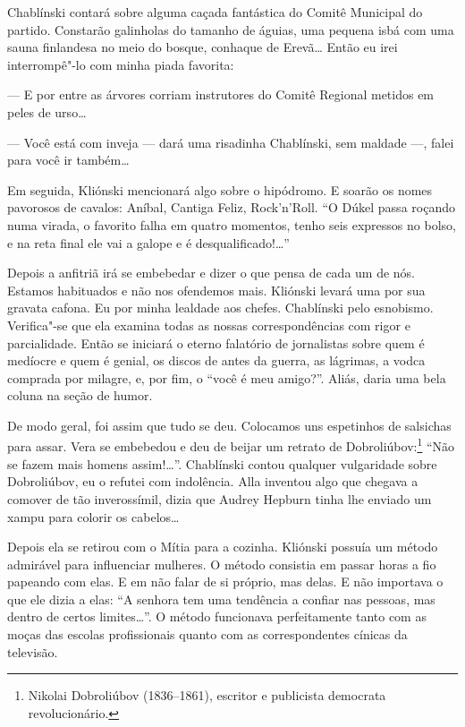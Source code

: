 Chablínski contará sobre alguma caçada fantástica do Comitê Municipal do
partido. Constarão galinholas do tamanho de águias, uma pequena isbá com
uma sauna finlandesa no meio do bosque, conhaque de Erevã\ldots{} Então eu
irei interrompê"-lo com minha piada favorita:

--- E por entre as árvores corriam instrutores do Comitê Regional
metidos em peles de urso\ldots{}

--- Você está com inveja --- dará uma risadinha Chablínski, sem maldade
---, falei para você ir também\ldots{}

Em seguida, Kliónski mencionará algo sobre o hipódromo. E soarão os
nomes pavorosos de cavalos: Aníbal, Cantiga Feliz, Rock'n'Roll. ``O
Dúkel passa roçando numa virada, o favorito falha em quatro momentos,
tenho seis expressos no bolso, e na reta final ele vai a galope e é
desqualificado!\ldots{}''

Depois a anfitriã irá se embebedar e dizer o que pensa de cada um de
nós. Estamos habituados e não nos ofendemos mais. Kliónski levará uma
por sua gravata cafona. Eu por minha lealdade aos chefes. Chablínski
pelo esnobismo. Verifica"-se que ela examina todas as nossas
correspondências com rigor e parcialidade. Então se iniciará o eterno
falatório de jornalistas sobre quem é medíocre e quem é genial, os
discos de antes da guerra, as lágrimas, a vodca comprada por milagre, e,
por fim, o ``você é meu amigo?''. Aliás, daria uma bela coluna na seção
de humor.

De modo geral, foi assim que tudo se deu. Colocamos uns espetinhos de
salsichas para assar. Vera se embebedou e deu de beijar um retrato de
Dobroliúbov:\footnote{Nikolai Dobroliúbov (1836--1861), escritor e
  publicista democrata revolucionário.} ``Não se fazem mais homens
assim!\ldots{}''. Chablínski contou qualquer vulgaridade sobre Dobroliúbov,
eu o refutei com indolência. Alla inventou algo que chegava a comover de
tão inverossímil, dizia que Audrey Hepburn tinha lhe enviado um xampu
para colorir os cabelos\ldots{}

Depois ela se retirou com o Mítia para a cozinha. Kliónski possuía um
método admirável para influenciar mulheres. O método consistia em passar
horas a fio papeando com elas. E em não falar de si próprio, mas delas.
E não importava o que ele dizia a elas: ``A senhora tem uma tendência a
confiar nas pessoas, mas dentro de certos limites\ldots{}''. O método
funcionava perfeitamente tanto com as moças das escolas profissionais
quanto com as correspondentes cínicas da televisão.

